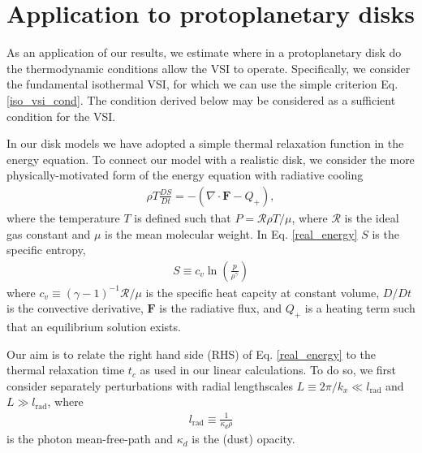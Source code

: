\section{Application to protoplanetary disks}\label{application} 
As an application of our results, we estimate where in a 
protoplanetary disk do the thermodynamic conditions allow the VSI to 
operate. Specifically, we consider the fundamental isothermal VSI, 
for which we can use the simple criterion Eq. \ref{iso_vsi_cond}. The
condition derived below may be considered as a sufficient condition for the VSI.  

In our disk models we have adopted a simple thermal relaxation
function in the energy equation. To connect our model with a realistic
disk, we consider the more physically-motivated form of the energy
equation with radiative cooling 
\begin{align}\label{real_energy}
\rho T \frac{DS}{Dt} = - \left(\nabla\cdot\bm{F} - Q_+\right), 
\end{align}
where the temperature $T$ is defined such that $P=\mathcal{R}\rho
T/\mu$, where $\mathcal{R}$ is the ideal gas constant and $\mu$ is
the mean molecular weight. In Eq. \ref{real_energy} $S$ is the
specific entropy,
\begin{align}
  S \equiv c_v\ln{\left(\frac{p}{\rho^{\gamma}}\right)} 
\end{align}
where $c_v \equiv \left(\gamma-1\right)^{-1}\mathcal{R}/\mu$ is the specific heat capcity at
constant volume, $D/Dt$ is the convective derivative, $\bm{F}$ is the
radiative flux, and $Q_+$ is a heating term such that an equilibrium
solution exists.  

Our aim is to relate the right hand side (RHS) of Eq. \ref{real_energy} to
the thermal relaxation time $t_c$ as used in our linear
calculations. To do so, we first consider separately perturbations
with radial lengthscales $L\equiv 2\pi/k_x\ll l_\mathrm{rad}$ and 
$L\gg l_\mathrm{rad}$, where      
\begin{align}\label{lrad}
  l_\mathrm{rad} \equiv \frac{1}{\kappa_d\rho} 
\end{align} 
is the photon mean-free-path and $\kappa_d$ is the (dust) opacity. 

